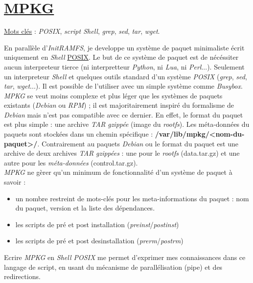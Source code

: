 \documentclass[a4paper]{article}
\begin{document}
\section{\href{https://github.com/gazoo74/mpkg/}{MPKG}}

\underline{Mots clés} : \textit{POSIX}, \textit{script Shell}, \textit{grep}, \textit{sed}, \textit{tar}, \textit{wget}.

En parallèle d'\textit{InitRAMFS}, je developpe un système de paquet minimaliste écrit uniquement en \textit{Shell} \href{https://fr.wikipedia.org/wiki/POSIX}{POSIX}. Le but de ce système de paquet est de nécéssiter aucun interpreteur tierce (ni interpretteur \textit{Python}, ni \textit{Lua}, ni \textit{Perl}...). Seulement un interpreteur \textit{Shell} et quelques outils standard d'un système \textit{POSIX} (\textit{grep}, \textit{sed}, \textit{tar}, \textit{wget}...). Il est possible de l'utiliser avec un simple système comme \textit{Busybox}.\\

\textit{MPKG} se veut moins complexe et plus léger que les systèmes de paquets existants (\textit{Debian} ou \textit{RPM}) ; il est majoritairement inspiré du formalisme de \textit{Debian} mais n'est pas compatible avec ce dernier. En effet, le format du paquet est plus simple : une archive \textit{TAR} \textit{gzippée} (image du \textit{rootfs}). Les méta-données du paquets sont stockées dans un chemin spécifique : \textbf{/var/lib/mpkg/<nom-du-paquet>/}.
Contrairement au paquets \textit{Debian} ou le format du paquet est une archive de deux archives \textit{TAR} \textit{gzippées} : une pour le \textit{rootfs} (data.tar.gz) et une autre pour les \textit{méta-données} (control.tar.gz).\\

\textit{MPKG} ne gèrer qu'un minimum de fonctionnalité d'un système de paquet à savoir :
\begin{itemize}
\item un nombre restreint de mots-clés pour les meta-informations du paquet : nom du paquet, version et la liste des dépendances.
\item les scripts de pré et post installation (\textit{preinst}/\textit{postinst})
\item les scripts de pré et post desinstallation (\textit{prerm}/\textit{postrm})
\end{itemize}

Ecrire \textit{MPKG} en \textit{Shell POSIX} me permet d'exprimer mes connaissances dans ce langage de script, en usant du mécanisme de parallélisation (pipe) et des redirections.
\clearpage
\end{document}
